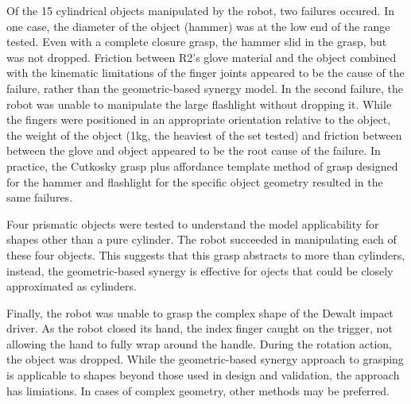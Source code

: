 \documentclass[runningheads,a4paper]{llncs}
\begin{document}
Of the 15 cylindrical objects manipulated by the robot, two failures occured. In one case, the diameter of the object (hammer) was at the low end of the range tested. Even with a complete closure grasp, the hammer slid in the grasp, but was not dropped. Friction between R2's glove material and the object combined with the kinematic limitations of the finger joints appeared to be the cause of the failure, rather than the geometric-based synergy model. In the second failure, the robot was unable to manipulate the large flashlight without dropping it. While the fingers were positioned in an appropriate orientation relative to the object, the weight of the object (1kg, the heaviest of the set tested) and friction between between the glove and object appeared to be the root cause of the failure. In practice, the Cutkosky grasp plus affordance template method of grasp designed for the hammer and flashlight for the specific object geometry resulted in the same failures. 

Four prismatic objects were tested to understand the model applicability for shapes other than a pure cylinder. The robot succeeded in manipulating each of these four objects. This suggests that this grasp abstracts to more than cylinders, instead, the geometric-based synergy is effective for ojects that could be closely approximated as cylinders.

Finally, the robot was unable to grasp the complex shape of the Dewalt impact driver. As the robot closed its hand, the index finger caught on the trigger, not allowing the hand to fully wrap around the handle. During the rotation action, the object was dropped. 
While the geometric-based synergy approach to grasping is applicable to shapes beyond those used in design and validation, the approach has limiations. In cases of complex geometry, other methods may be preferred. 


\end{document}
